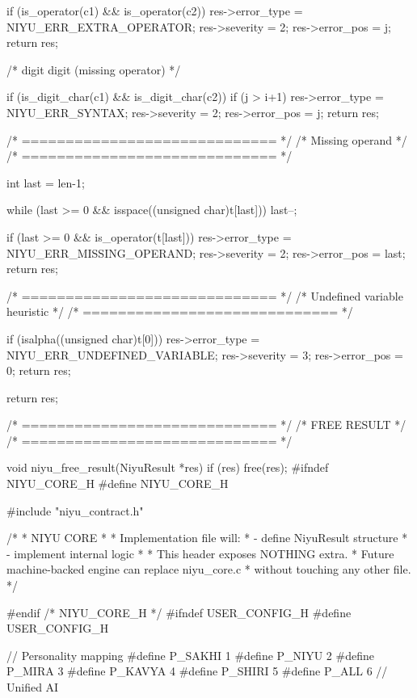 \documentclass{article}
\begin{document}
{{        if (is_operator(c1) && is_operator(c2))
        {
            res->error_type = NIYU_ERR_EXTRA_OPERATOR;
            res->severity = 2;
            res->error_pos = j;
            return res;
        }

        /* digit digit (missing operator) */

        if (is_digit_char(c1) && is_digit_char(c2))
        {
            if (j > i+1)
            {
                res->error_type = NIYU_ERR_SYNTAX;
                res->severity = 2;
                res->error_pos = j;
                return res;
            }
        }
    }

    /* ============================= */
    /* Missing operand               */
    /* ============================= */

    int last = len-1;

    while (last >= 0 && isspace((unsigned char)t[last]))
        last--;

    if (last >= 0 && is_operator(t[last]))
    {
        res->error_type = NIYU_ERR_MISSING_OPERAND;
        res->severity = 2;
        res->error_pos = last;
        return res;
    }

    /* ============================= */
    /* Undefined variable heuristic  */
    /* ============================= */

    if (isalpha((unsigned char)t[0]))
    {
        res->error_type = NIYU_ERR_UNDEFINED_VARIABLE;
        res->severity = 3;
        res->error_pos = 0;
        return res;
    }

    return res;
}


/* ============================= */
/* FREE RESULT                   */
/* ============================= */

void niyu_free_result(NiyuResult *res)
{
    if (res)
        free(res);
}
#ifndef NIYU_CORE_H
#define NIYU_CORE_H

#include "niyu_contract.h"

/*
 * NIYU CORE
 *
 * Implementation file will:
 * - define NiyuResult structure
 * - implement internal logic
 *
 * This header exposes NOTHING extra.
 * Future machine-backed engine can replace niyu_core.c
 * without touching any other file.
 */

#endif /* NIYU_CORE_H */
#ifndef USER_CONFIG_H
#define USER_CONFIG_H

// Personality mapping
#define P_SAKHI 1
#define P_NIYU  2
#define P_MIRA  3
#define P_KAVYA 4
#define P_SHIRI 5
#define P_ALL   6   // Unified AI
\end{document}
